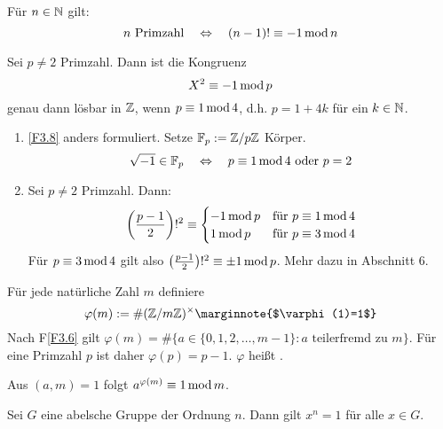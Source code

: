\begin{falko} \label{F3.7}
	Für $n \in \NN$ gilt: 
	\[ n \text{ Primzahl} \quad \Leftrightarrow \quad (n-1)! \kon -1 \modu n \]
\end{falko}

\begin{falko} \label{F3.8}
	Sei $p \neq 2$ Primzahl. Dann ist die Kongruenz
	\[ X^2 \kon -1 \modu p \]
	genau dann lösbar in $\ZZ$, wenn $p \kon 1 \modu 4$, d.h. $p = 1+4k$ für ein $k \in \NN$.
\end{falko}

	\begin{enumerate}[1)]
		\item \ref{F3.8} anders formuliert. Setze $\FF_p := \ZZ/p\ZZ$ Körper.
		\[ \sqrt{-1} \in \FF_p \quad \Leftrightarrow \quad p \kon 1 \modu 4 \text{ oder } p = 2 \]
		\item Sei $p \neq 2$ Primzahl. Dann:
		\[ \enbrace*{\frac{p-1}{2}}!^2 \kon \begin{cases}
			-1 \modu p & \text{für } p \kon 1 \modu 4 \\
			1 \modu p & \text{für } p \kon 3 \modu 4
		\end{cases} \]
		Für $p \kon 3 \modu 4$ gilt also $\enbrace*{\frac{p-1}{2}}!^2 \kon \pm 1 \modu p$. Mehr dazu in Abschnitt 6.
	\end{enumerate}
	
\begin{defn}
	Für jede natürliche Zahl $m$ definiere
	\[ \varphi(m) := \#(\ZZ/m\ZZ)^\times \marginnote{$\varphi(1)=1$} \]
	Nach F\ref{F3.6} gilt $\varphi(m) = \# \{a \in \{0, 1, 2, \dots, m-1\} : a \text{ teilerfremd zu } m \}$. Für eine Primzahl $p$ ist daher $\varphi(p) = p-1$. $\varphi$ heißt .
\end{defn}

\setcounter{countsatz}{0}
\begin{satz} \label{satz_3.1a}
	Aus $(a,m) = 1$ folgt $a^{\varphi(m)} \kon 1 \modu m$. 
\end{satz}

\begin{lemma}
	Sei $G$ eine abelsche Gruppe der Ordnung $n$. Dann gilt $x^n = 1$ für alle $x \in G$.
\end{lemma}

